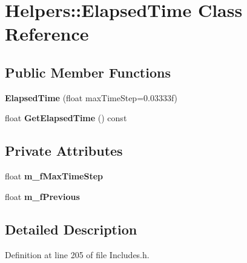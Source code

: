 \hypertarget{class_helpers_1_1_elapsed_time}{}\section{Helpers\+:\+:Elapsed\+Time Class Reference}
\label{class_helpers_1_1_elapsed_time}
\subsection*{Public Member Functions}
\begin{DoxyCompactItemize}
\item 
{\bfseries Elapsed\+Time} (float max\+Time\+Step=0.\+03333f)\hypertarget{class_helpers_1_1_elapsed_time_a6802c9506ea1d2984db2dfc853e69890}{}\label{class_helpers_1_1_elapsed_time_a6802c9506ea1d2984db2dfc853e69890}

\item 
float {\bfseries Get\+Elapsed\+Time} () const \hypertarget{class_helpers_1_1_elapsed_time_ab184519b80f819a5f18507b00194bdd6}{}\label{class_helpers_1_1_elapsed_time_ab184519b80f819a5f18507b00194bdd6}

\end{DoxyCompactItemize}
\subsection*{Private Attributes}
\begin{DoxyCompactItemize}
\item 
float {\bfseries m\+\_\+f\+Max\+Time\+Step}\hypertarget{class_helpers_1_1_elapsed_time_a2702d8a9f3bd81e3a4bf01e79150b636}{}\label{class_helpers_1_1_elapsed_time_a2702d8a9f3bd81e3a4bf01e79150b636}

\item 
float {\bfseries m\+\_\+f\+Previous}\hypertarget{class_helpers_1_1_elapsed_time_a8f97573e4c9f6e46ab25a2ab963f69ed}{}\label{class_helpers_1_1_elapsed_time_a8f97573e4c9f6e46ab25a2ab963f69ed}

\end{DoxyCompactItemize}


\subsection{Detailed Description}


Definition at line 205 of file Includes.\+h.

